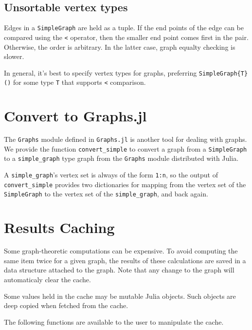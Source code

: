 \documentclass[oneside]{amsart}
\begin{document}
\subsection*{Unsortable vertex types}

Edges in a \verb|SimpleGraph| are held as a tuple. If the end points
of the edge can be compared using the \verb|<| operator, then the
smaller end point comes first in the pair. Otherwise, the order is
arbitrary. In the latter case, graph equalty checking is slower.

In general, it's best to specify vertex types for graphs, preferring
\verb|SimpleGraph{T}()| for some type \verb|T| that supports \verb|<|
comparison.


\section{Convert to Graphs.jl}
\label{sect:convert}
The \verb|Graphs| module defined in \verb|Graphs.jl| is another tool
for dealing with graphs. We provide the function \verb|convert_simple|
to convert a graph from a \verb|SimpleGraph| to a
\verb|simple_graph| type graph from the \verb|Graphs| module
distributed with Julia.

A \verb|simple_graph|'s vertex set is always of the form \verb|1:n|,
so the output of \verb|convert_simple| provides two dictionaries for
mapping from the vertex set of the \verb|SimpleGraph| to the vertex set
of the \verb|simple_graph|, and back again.


\section{Results Caching}
\label{sect:cache}

Some graph-theoretic computations can be expensive. To avoid computing
the same item twice for a given graph, the results of these
calculations are saved in a data structure attached to the graph. Note
that any change to the graph will automaticaly clear the cache.

Some values held in the cache may be mutable Julia objects. Such
objects are deep copied when fetched from the cache.


The following functions are available to the user to manipulate the
cache.
\end{document}
